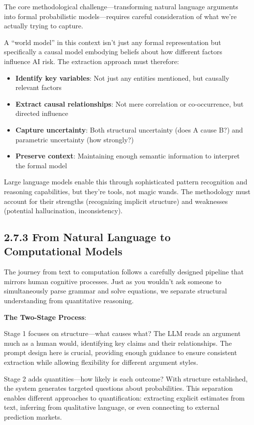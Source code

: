 \documentclass[
  11pt,
  letterpaper,
]{book}
\providecommand{\tightlist}{%
  \setlength{\itemsep}{0pt}\setlength{\parskip}{0pt}}
\begin{document}
The core methodological challenge---transforming natural language
arguments into formal probabilistic models---requires careful
consideration of what we're actually trying to capture.

A ``world model'' in this context isn't just any formal representation
but specifically a causal model embodying beliefs about how different
factors influence AI risk. The extraction approach must therefore:

\begin{itemize}
\tightlist
\item
  \textbf{Identify key variables}: Not just any entities mentioned, but
  causally relevant factors
\item
  \textbf{Extract causal relationships}: Not mere correlation or
  co-occurrence, but directed influence
\item
  \textbf{Capture uncertainty}: Both structural uncertainty (does A
  cause B?) and parametric uncertainty (how strongly?)
\item
  \textbf{Preserve context}: Maintaining enough semantic information to
  interpret the formal model
\end{itemize}

Large language models enable this through sophisticated pattern
recognition and reasoning capabilities, but they're tools, not magic
wands. The methodology must account for their strengths (recognizing
implicit structure) and weaknesses (potential hallucination,
inconsistency).

\subsection{2.7.3 From Natural Language to Computational
Models}\label{sec-natural-to-computational}

The journey from text to computation follows a carefully designed
pipeline that mirrors human cognitive processes. Just as you wouldn't
ask someone to simultaneously parse grammar and solve equations, we
separate structural understanding from quantitative reasoning.

\textbf{The Two-Stage Process}:

Stage 1 focuses on structure---what causes what? The LLM reads an
argument much as a human would, identifying key claims and their
relationships. The prompt design here is crucial, providing enough
guidance to ensure consistent extraction while allowing flexibility for
different argument styles.

Stage 2 adds quantities---how likely is each outcome? With structure
established, the system generates targeted questions about
probabilities. This separation enables different approaches to
quantification: extracting explicit estimates from text, inferring from
qualitative language, or even connecting to external prediction markets.
\end{document}
